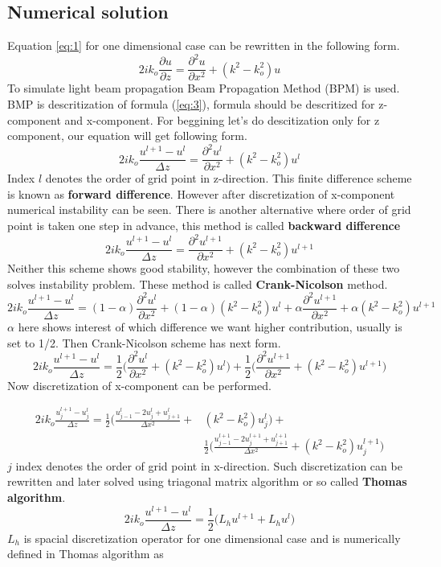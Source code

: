 \documentclass[a4paper]{article}
\begin{document}
	\subsection{Numerical solution}
	Equation \ref{eq:1} for one dimensional case can be rewritten in the following form.
	\begin{equation}\label{eq:3}
	2ik_o\frac{\partial u}{\partial z}=\frac{\partial^2 u}{\partial x^2}+(k^2-k_o^2)u
	\end{equation}
	To simulate light beam propagation Beam Propagation Method (BPM) is used. BMP is descritization of formula (\ref{eq:3}), formula should be descritized for z-component and x-component. For beggining let's do descitization only for z component, our equation will get following form.
	\[2ik_o\frac{u^{l+1}-u^l}{\Delta z}=\frac{\partial^2 u^l}{\partial x^2}+(k^2-k_o^2)u^l\]
	Index $l$ denotes the order of grid point in z-direction. This finite difference scheme is known as {\bf forward difference}. However after discretization of x-component numerical instability can be seen. There is another alternative where order of grid point is taken one step in advance, this method is called {\bf backward difference}
	\[2ik_o\frac{u^{l+1}-u^l}{\Delta z}=\frac{\partial^2 u^{l+1}}{\partial x^2}+(k^2-k_o^2)u^{l+1}\]
	Neither this scheme shows good stability, however the combination of these two solves instability problem. These method is called {\bf Crank-Nicolson} method.
	\[2ik_o\frac{u^{l+1}-u^l}{\Delta z}=(1-\alpha)\frac{\partial^2 u^l}{\partial x^2}+(1-\alpha)(k^2-k_o^2)u^l+\alpha \frac{\partial^2 u^{l+1}}{\partial x^2}+\alpha(k^2-k_o^2)u^{l+1}\]
	$\alpha$ here shows interest of which difference we want higher contribution, usually is set to 1/2. Then Crank-Nicolson scheme has next form.
	\[2ik_o\frac{u^{l+1}-u^l}{\Delta z}=\frac{1}{2}\bigg(\frac{\partial^2 u^l}{\partial x^2}+(k^2-k_o^2)u^l\bigg)+\frac{1}{2}\bigg(\frac{\partial^2 u^{l+1}}{\partial x^2}+(k^2-k_o^2)u^{l+1}\bigg)\]
	Now discretization of x-component can be performed.

	\begin{equation*}
	\begin{split}
	2ik_o\frac{u_j^{l+1}-u_j^l}{\Delta z}=\frac{1}{2}\bigg(\frac{u_{j-1}^l-2u_j^l+u_{j+1}^l}{\Delta x^2}+&(k^2-k_o^2)u_j^l\bigg)+\\
	& \frac{1}{2}\bigg(\frac{u_{j-1}^{l+1}-2u_j^{l+1}+u_{j+1}^{l+1}}{\Delta x^2}+(k^2-k_o^2)u_j^{l+1}\bigg)
	\end{split}
	\end{equation*}
	$j$ index denotes the order of grid point in x-direction. Such discretization can be rewritten and later solved using triagonal matrix algorithm or so called {\bf Thomas algorithm}. 
	\[2ik_o\frac{u^{l+1}-u^l}{\Delta z}=\frac{1}{2}\bigg(L_hu^{l+1}+L_hu^l\bigg)\]
	$L_h$ is spacial discretization operator for one dimensional case and is numerically defined in Thomas algorithm as 
\end{document}
